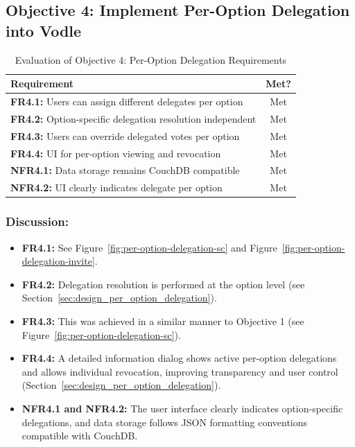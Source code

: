 \subsection{Objective 4: Implement Per-Option Delegation into Vodle}

\begin{table}[H]
\centering
\begin{tabular}{|p{9cm}|c|}
\hline
\textbf{Requirement} & \textbf{Met?} \\ \hline
\textbf{FR4.1:} Users can assign different delegates per option & Met \\ \hline
\textbf{FR4.2:} Option-specific delegation resolution independent & Met \\ \hline
\textbf{FR4.3:} Users can override delegated votes per option & Met \\ \hline
\textbf{FR4.4:} UI for per-option viewing and revocation & Met \\ \hline
\textbf{NFR4.1:} Data storage remains CouchDB compatible & Met \\ \hline
\textbf{NFR4.2:} UI clearly indicates delegate per option & Met \\ \hline
\end{tabular}
\caption{Evaluation of Objective 4: Per-Option Delegation Requirements}
\label{tab:objective4_requirements}
\end{table}

\subsubsection{Discussion:}

\begin{itemize}
    \item \textbf{FR4.1:} See Figure~\ref{fig:per-option-delegation-sc} and Figure~\ref{fig:per-option-delegation-invite}.
    \item \textbf{FR4.2:} Delegation resolution is performed at the option level (see Section~\ref{sec:design_per_option_delegation}).
    \item \textbf{FR4.3:} This was achieved in a similar manner to Objective 1 (see Figure~\ref{fig:per-option-delegation-sc}).
    \item \textbf{FR4.4:} A detailed information dialog shows active per-option delegations and allows individual revocation, improving transparency and user control (Section~\ref{sec:design_per_option_delegation}).
    \item \textbf{NFR4.1 and NFR4.2:} The user interface clearly indicates option-specific delegations, and data storage follows JSON formatting conventions compatible with CouchDB.
\end{itemize}

